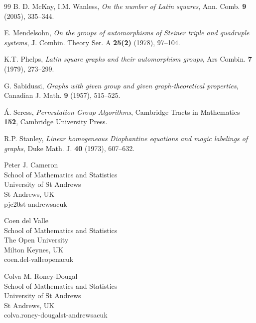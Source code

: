 \documentclass{daj}
\theoremstyle{plain}
\theoremstyle{definition}
\begin{document}
\begin{thebibliography}{99}
B. D. McKay, I.M. Wanless, \emph{On the number of Latin squares}, Ann. Comb. \textbf{9} (2005), 335--344.

E. Mendelsohn, \emph{On the groups of automorphisms of Steiner triple and quadruple systems}, J. Combin. Theory Ser. A \textbf{25(2)} (1978), 97--104.

K.T. Phelps, \emph{Latin square graphs and their automorphism groups}, Ars Combin. \textbf{7} (1979), 273--299.

G. Sabidussi, \emph{Graphs with given group and given graph-theoretical properties}, Canadian J. Math.  \textbf{9} (1957), 515--525.

\'A. Seress, \emph{Permutation {G}roup {A}lgorithms}, Cambridge Tracts in Mathematics \textbf{152}, Cambridge University Press.

R.P. Stanley, \emph{Linear homogeneous {D}iophantine equations and magic labelings of graphs}, Duke Math. J. \textbf{40} (1973), 607--632.

\end{thebibliography}

\begin{dajauthors}
\begin{authorinfo}[Cam]
  Peter J. Cameron\\
  School of Mathematics and Statistics\\
  University of St Andrews\\
  St Andrews, UK\\
  pjc20\imageat{}st-andrews\imagedot{}ac\imagedot{}uk
\end{authorinfo}
\begin{authorinfo}[del]
  Coen del Valle\\
  School of Mathematics and Statistics\\
  The Open University\\
  Milton Keynes, UK\\
  coen.del-valle\imageat{}open\imagedot{}ac\imagedot{}uk
\end{authorinfo}
\begin{authorinfo}[Ron]
  Colva M. Roney-Dougal\\
  School of Mathematics and Statistics\\
  University of St Andrews\\
  St Andrews, UK\\
  colva.roney-dougal\imageat{}st-andrews\imagedot{}ac\imagedot{}uk
\end{authorinfo}
\end{dajauthors}
\end{document}
